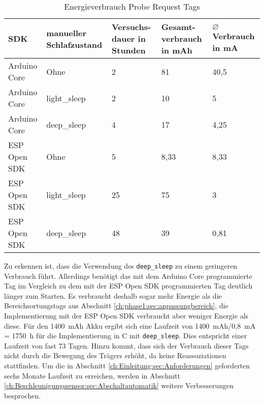 \begin{table}[h]
	\centering
	\caption{Energieverbrauch Probe Request Tags}
	\label{table:probeconsumption}
	\begin{tabular}{p{3cm}|p{2.4cm}|p{2cm}|p{2cm}|p{2cm}}
		SDK & manueller Schlafzustand  & Versuchs-dauer in Stunden & Gesamt-verbrauch in mAh & $\varnothing$ Verbrauch in mA \\
		\hline
		Arduino Core & Ohne & 2 & 81 & 40,5 \\
		Arduino Core & light\_sleep & 2 & 10 & 5 \\
		Arduino Core & deep\_sleep & 4 & 17 & 4,25 \\
		ESP Open SDK & Ohne & 5 & 8,33 & 8,33 \\
		ESP Open SDK & light\_sleep & 25 & 75 & 3 \\
		ESP Open SDK & deep\_sleep & 48 & 39 & 0,81 \\
	\end{tabular}
\end{table}


Zu erkennen ist, dass die Verwendung des \texttt{deep\_sleep} zu einem geringeren Verbrauch führt. 
Allerdings benötigt das mit dem Arduino Core programmierte Tag im Vergleich zu dem mit der ESP Open SDK programmierten Tag deutlich länger zum Starten.
Es verbraucht deshalb sogar mehr Energie als die Bereichsortungstags aus Abschnitt \ref{ch:phase1:sec:anpassungbereich}, die Implementierung mit der ESP Open SDK verbraucht aber weniger Energie als diese.
Für den 1400\ mAh Akku ergibt sich eine Laufzeit von 1400\ mAh/0,8\ mA = 1750\ h für die Implementierung in C mit \texttt{deep\_sleep}.
Dies entspricht einer Laufzeit von fast 73 Tagen.
Hinzu kommt, dass sich der Verbrauch dieser Tags nicht durch die Bewegung des Trägers erhöht, da keine Reassoziationen stattfinden.
Um die in Abschnitt \ref{ch:Einleitung:sec:Anforderungen} geforderten sechs Monate Laufzeit zu erreichen, werden in Abschnitt \ref{ch:Beschleunigungssensor:sec:Abschaltautomatik} weitere Verbesserungen besprochen.

